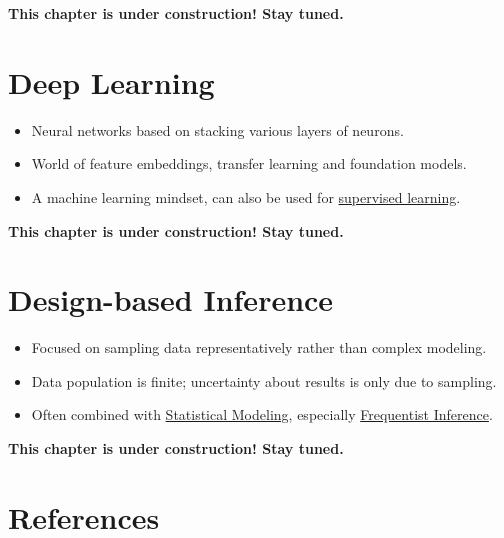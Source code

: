 \documentclass[
  10pt,
]{scrbook}
\providecommand{\tightlist}{%
  \setlength{\itemsep}{0pt}\setlength{\parskip}{0pt}}
\begin{document}
\textbf{This chapter is under construction! Stay tuned.}

\hypertarget{deep-learning}{%
\chapter{Deep Learning}\label{deep-learning}}

\begin{itemize}
\tightlist
\item
  Neural networks based on stacking various layers of neurons.
\item
  World of feature embeddings, transfer learning and foundation models.
\item
  A machine learning mindset, can also be used for \protect\hyperlink{supervised-ml}{supervised learning}.
\end{itemize}

\textbf{This chapter is under construction! Stay tuned.}

\hypertarget{design-based-inference}{%
\chapter{Design-based Inference}\label{design-based-inference}}

\begin{itemize}
\tightlist
\item
  Focused on sampling data representatively rather than complex modeling.
\item
  Data population is finite; uncertainty about results is only due to sampling.
\item
  Often combined with \protect\hyperlink{statistical-modeling}{Statistical Modeling}, especially \protect\hyperlink{frequentist-inference}{Frequentist Inference}.
\end{itemize}

\textbf{This chapter is under construction! Stay tuned.}

\hypertarget{references}{%
\chapter*{References}\label{references}}
\end{document}
